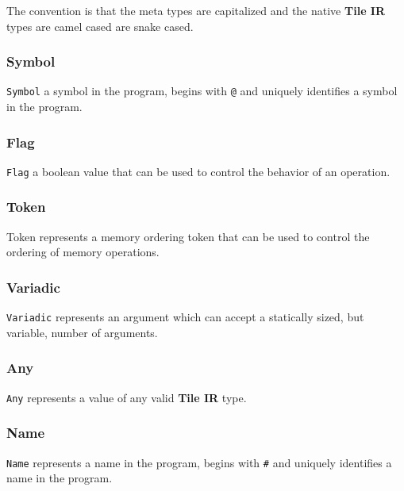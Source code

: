 \documentclass{article}
\begin{document}
The convention is that the meta types are capitalized and the native \textbf{Tile IR} types are camel cased are snake cased.


\subsubsection{Symbol}

\texttt{Symbol} a symbol in the program, begins with \texttt{@} and uniquely identifies a symbol in the program.



\subsubsection{Flag}

\texttt{Flag} a boolean value that can be used to control the behavior of an operation.



\subsubsection{Token}

Token represents a memory ordering token that can be used to control the ordering of memory operations.



\subsubsection{Variadic}

\texttt{Variadic} represents an argument which can accept a statically sized, but variable, number of arguments.



\subsubsection{Any}

\texttt{Any} represents a value of any valid \textbf{Tile IR} type.



\subsubsection{Name}

\texttt{Name} represents a name in the program, begins with \texttt{\#} and uniquely identifies a name in the program.
\end{document}
